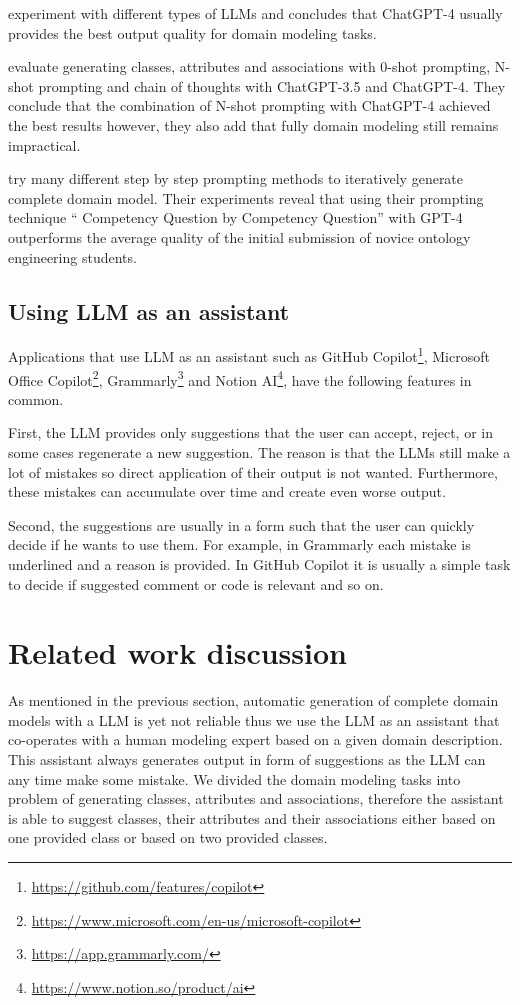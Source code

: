 \citet{BabaeiGiglou2023} experiment with different types of LLMs and concludes that ChatGPT-4 usually provides the best output quality for domain modeling tasks.

\citet{Chen2023} evaluate generating classes, attributes and associations with 0-shot prompting, N-shot prompting and chain of thoughts with ChatGPT-3.5 and ChatGPT-4. They conclude that the combination of N-shot prompting with ChatGPT-4 achieved the best results however, they also add that fully domain modeling still remains impractical.

\citet{Saeedizade2024} try many different step by step prompting methods to iteratively generate complete domain model. Their experiments reveal that using their prompting technique `` Competency Question by Competency Question'' with GPT-4 outperforms the average quality of the initial submission of novice ontology engineering students. 


\section{Using LLM as an assistant}
\label{section:llm_as_an_assistant}

Applications that use LLM as an assistant such as GitHub Copilot\footnote{\url{https://github.com/features/copilot}}, Microsoft Office Copilot\footnote{\url{https://www.microsoft.com/en-us/microsoft-copilot}}, Grammarly\footnote{\url{https://app.grammarly.com/}} and Notion AI\footnote{\url{https://www.notion.so/product/ai}}, have the following features in common.

First, the LLM provides only suggestions that the user can accept, reject, or in some cases regenerate a new suggestion. The reason is that the LLMs still make a lot of mistakes so direct application of their output is not wanted. Furthermore, these mistakes can accumulate over time and create even worse output.

Second, the suggestions are usually in a form such that the user can quickly decide if he wants to use them. For example, in Grammarly each mistake is underlined and a reason is provided. In GitHub Copilot it is usually a simple task to decide if suggested comment or code is relevant and so on.


\chapter{Related work discussion}

As mentioned in the previous section, automatic generation of complete domain models with a LLM is yet not reliable thus we use the LLM as an assistant that co-operates with a human modeling expert based on a given domain description. This assistant always generates output in form of suggestions as the LLM can any time make some mistake. We divided the domain modeling tasks into problem of generating classes, attributes and associations, therefore the assistant is able to suggest classes, their attributes and their associations either based on one provided class or based on two provided classes.

